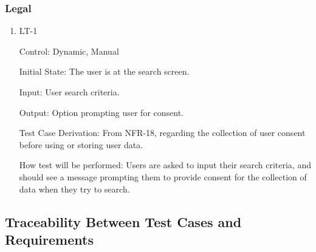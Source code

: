 \documentclass[12pt, titlepage]{article}
\begin{document}
\subsubsection{Legal}

\begin{enumerate}
\item{LT-1}

Control: Dynamic, Manual
					
Initial State: The user is at the search screen.

Input: User search criteria.

Output: Option prompting user for consent.

Test Case Derivation: From NFR-18, regarding the collection of user consent before using or storing user data.

How test will be performed: Users are asked to input their search criteria, and should see a message prompting them to provide consent for the collection of data when they try to search.

\end{enumerate}

\subsection{Traceability Between Test Cases and Requirements}
\end{document}
